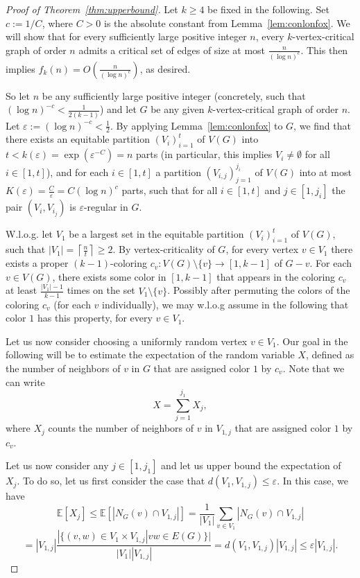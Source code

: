 \documentclass[a4paper,10pt,hidelinks]{amsart}
\theoremstyle{definition}
\begin{document}
\begin{proof}[Proof of Theorem~\ref{thm:upperbound}]
Let $k\ge 4$ be fixed in the following. Set $c:=1/C$, where $C>0$ is the absolute constant from Lemma~\ref{lem:conlonfox}. We will show that for every sufficiently large positive integer $n$, every $k$-vertex-critical graph of order $n$ admits a critical set of edges of size at most $\frac{n}{(\log n)^c}$. This then implies $f_k(n)=O\left(\frac{n}{(\log n)^c}\right)$, as desired. 

So let $n$ be any sufficiently large positive integer (concretely, such that $(\log n)^{-c}<\frac{1}{2(k-1)}$) and let $G$ be any given $k$-vertex-critical graph of order $n$. Let $\varepsilon:=(\log n)^{-c}<\frac{1}{2}$. By applying Lemma~\ref{lem:conlonfox} to $G$, we find that there exists an equitable partition $(V_i)_{i=1}^{t}$ of $V(G)$ into $t< k(\varepsilon)=\exp(\varepsilon^{-C})=n$ parts (in particular, this implies $V_i\neq \emptyset$ for all $i\in [1,t]$), and for each $i\in [1,t]$ a partition $(V_{i,j})_{j=1}^{j_i}$ of $V(G)$ into at most $K(\varepsilon)=\frac{C}{\varepsilon}=C(\log n)^c$ parts, such that for all $i\in [1,t]$ and $j\in [1,j_i]$ the pair $(V_i,V_{i_j})$ is $\varepsilon$-regular in $G$. 

W.l.o.g. let $V_1$ be a largest set in the equitable partition $(V_i)_{i=1}^{t}$ of $V(G)$, such that $|V_1|=\left\lceil \frac{n}{t}\right\rceil \ge 2$. By vertex-criticality of $G$, for every vertex $v\in V_1$ there exists a proper $(k-1)$-coloring $c_v:V(G)\setminus \{v\}\rightarrow [1,k-1]$ of $G-v$. For each $v\in V(G)$, there exists some color in $[1,k-1]$ that appears in the coloring $c_v$ at least $\frac{|V_1|-1}{k-1}$ times on the set $V_1\setminus \{v\}$. Possibly after permuting the colors of the coloring $c_v$ (for each $v$ individually), we may w.l.o.g assume in the following that color $1$ has this property, for every $v\in V_1$. 

Let us now consider choosing a uniformly random vertex $v\in V_1$. Our goal in the following will be to estimate the expectation of the random variable $X$, defined as the number of neighbors of $v$ in $G$ that are assigned color $1$ by $c_v$. Note that we can write $$X=\sum_{j=1}^{j_1}X_j,$$ where $X_j$ counts the number of neighbors of $v$ in $V_{1,j}$ that are assigned color $1$ by $c_v$. 

Let us now consider any $j\in [1,j_1]$ and let us upper bound the expectation of $X_j$. To do so, let us first consider the case that $d(V_1,V_{1,j})\le \varepsilon$. In this case, we have
$$\mathbb{E}[X_j]\le \mathbb{E}[|N_G(v)\cap V_{1,j}|]=\frac{1}{|V_1|}\sum_{v\in V_1}|N_G(v)\cap V_{1,j}|$$
$$=|V_{1,j}|\frac{|\{(v,w)\in V_1\times V_{1,j}|vw\in E(G)\}|}{|V_1||V_{1,j}|}=d(V_1,V_{1,j})|V_{1,j}|\le \varepsilon |V_{1,j}|.$$


\end{proof}
\end{document}
